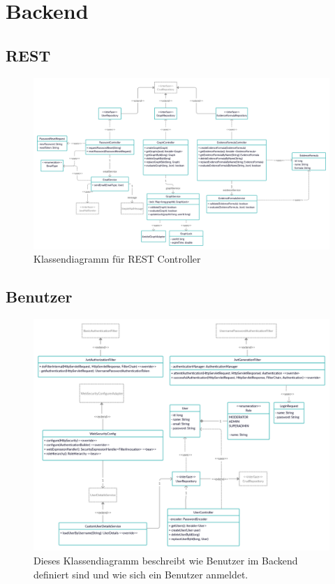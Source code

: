 \documentclass{article}
\begin{document}
\section{Backend}
\subsection{REST}
\begin{figure}[ht!]
    \includegraphics[width=\linewidth]{image/Rest_Controller.png}
    \caption{Klassendiagramm für REST Controller}
\end{figure}
\newpage

\subsection{Benutzer}
\begin{figure}[ht!]
    \includegraphics[width=\textwidth,height=\textheight,keepaspectratio]{image/LoginUser.png}
    \caption{Dieses Klassendiagramm beschreibt wie Benutzer im Backend definiert sind und wie sich ein Benutzer anmeldet. }
\end{figure}
\newpage
\end{document}

